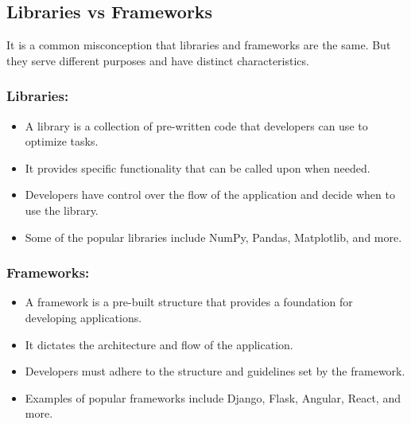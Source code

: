 \subsection{Libraries vs Frameworks}It is a common misconception that libraries and frameworks are the same. But they serve different purposes and have distinct characteristics.
\subsubsection{Libraries:}
\begin{itemize}
    \item A library is a collection of pre-written code that developers can use to optimize tasks.
    \item It provides specific functionality that can be called upon when needed.
    \item Developers have control over the flow of the application and decide when to use the library.
    \item Some of the popular libraries include NumPy, Pandas, Matplotlib, and more.\newline
\end{itemize}


\subsubsection{Frameworks:}
\begin{itemize}
    \item A framework is a pre-built structure that provides a foundation for developing applications.
    \item It dictates the architecture and flow of the application.
    \item Developers must adhere to the structure and guidelines set by the framework.
    \item Examples of popular frameworks include Django, Flask, Angular, React, and more. \newline
\end{itemize}